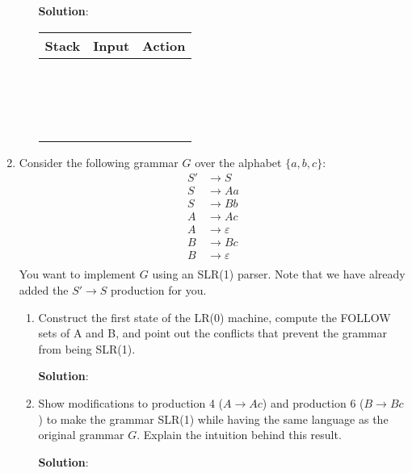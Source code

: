 \documentclass[11pt]{article}
\let\epsilon\varepsilon
\begin{document}
\begin{enumerate}
\begin{enumerate}
    \textbf{Solution}:
    \begin{center}
      \begin{tabular}{R{10em}|R{10em}|L{10em}}
        Stack & Input & Action \\
        \hline
        & & \\
        & & \\
        & & \\
        & & \\
        & & \\
        & & \\
        & & \\
        & & \\
        & & \\
        & & \\
        & & \\
        & & \\
        & & \\
        & & \\
        & & \\
        & & \\
        & & \\
      \end{tabular}
    \end{center}
  \end{enumerate}

  \newpage

\item Consider the following grammar $G$ over the alphabet $\{a,b,c\}$:
  \begin{equation*}
    \begin{split}
      S' &\to S \\
      S &\to Aa \\
      S &\to Bb \\
      A &\to Ac \\
      A &\to \epsilon\\
      B &\to Bc \\
      B &\to \epsilon \\
    \end{split}
  \end{equation*}
  You want to implement $G$ using an SLR(1) parser. Note that we have already added the $S' \to S$ production for you.
  \begin{enumerate}
  \item Construct the first state of the LR(0) machine, compute the FOLLOW sets of A and B, and point out the conflicts that prevent the grammar from being SLR(1).

    \textbf{Solution}:

  \item Show modifications to production 4 ($A \to Ac$) and production 6 ($B \to Bc$) to make the grammar SLR(1) while having the same language as the original grammar $G$. Explain the intuition behind this result.

    \textbf{Solution}:
  \end{enumerate} 

\end{enumerate}
\end{document}
